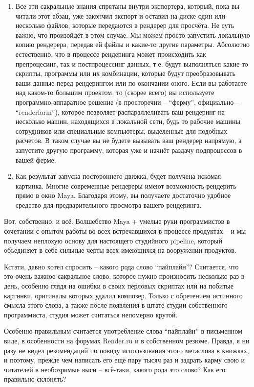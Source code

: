 \begin{enumerate}
 \item                    Все эти сакральные знания спрятаны внутри
    экспортера, который, пока вы читали этот абзац, уже закончил
    экспорт и оставил на диске один или несколько файлов, которые
    передаются в рендерер для просчёта. Не суть важно, что произойдёт в
    этом случае. Мы можем просто запустить локальную копию рендерера,
    передав ей файлы и какие-то другие параметры. Абсолютно
    естественно, что в процессе рендеринга может происходить как
    препроцесинг,  так и
    постпроцессинг данных, т.е. будут выполняться какие-то скрипты,
    программы или их комбинации, которые будут преобразовывать ваши
    данные перед рендерингом или по окончании оного. Если вы работаете
    над каком-то большим проектом, то (скорее всего) вы используете
    программно-аппаратное решение (в просторечии – “ферму”, официально
    – “renderfarm”), которое позволяет
    распараллеливать ваш рендеринг на несколько машин, находящихся в
    локальной сети, будь то рабочие машины сотрудников или  специальные компьютеры,
    выделенные для подобных расчетов. В таком случае вы не будете
    вызывать ваш рендерер напрямую, а запустите другую программу,
    которая уже и начнёт раздачу подпроцессов в вашей ферме.
  

 \item                    Как результат запуска постороннего
    движка, будет получена искомая картинка. Многие современные
    рендереры имеют возможность рендерить прямо в окно Maya. Благодаря
    этому, вы получаете достаточно удобное средство для
    предварительного просмотра вашего рендеринга.
  
\end{enumerate}


 Вот, собственно, и всё. Волшебство Maya +
    умелые руки программистов в сочетании с опытом работы во всех
    встречавшихся в процессе продуктах – и мы получаем неплохую основу
    для настоящего студийного pipeline, который
    объединяет в себе сильные черты всех имеющихся на вооружении
    продуктов.
  

 Кстати, давно хотел спросить – какого рода слово
    “пайплайн”? Считается, что это очень важное сакральное слово,
    которое нужно произносить несколько раз в день, особенно глядя на
    ошибки в своих перловых скриптах или на побитые картинки, оригиналы
    которых удалил композер. Только с обретением истинного смысла этого
    слова, а также после появления в штате студии собственного
    программиста, студия может считаться непомерно крутой. 
  

 Особенно правильным считается употребление слова
    “пайплайн” в письменном виде, в особенности на форумах Render.ru и в собственном резюме. Правда, я ни разу не видел
    рекомендаций по поводу использования этого мегаслова в книжках, и
    поэтому, прежде чем написать его ещё пару тысяч раз и задрать карму
    свою и читателей в необозримые выси – всё-таки, какого рода это
    слово? Как его правильно склонять?
